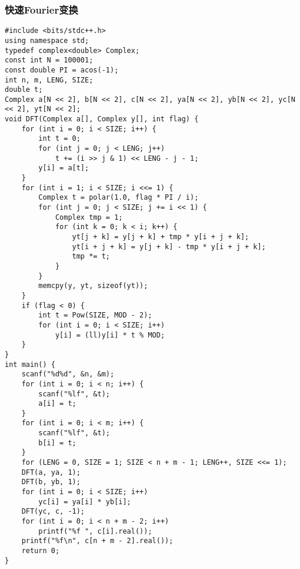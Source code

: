 ﻿\documentclass[a4paper]{article}
\begin{document}
\subsubsection{快速Fourier变换}
\begin{lstlisting}
#include <bits/stdc++.h>
using namespace std;
typedef complex<double> Complex;
const int N = 100001;
const double PI = acos(-1);
int n, m, LENG, SIZE;
double t;
Complex a[N << 2], b[N << 2], c[N << 2], ya[N << 2], yb[N << 2], yc[N << 2], yt[N << 2];
void DFT(Complex a[], Complex y[], int flag) {
    for (int i = 0; i < SIZE; i++) {
        int t = 0;
        for (int j = 0; j < LENG; j++)
            t += (i >> j & 1) << LENG - j - 1;
        y[i] = a[t];
    }
    for (int i = 1; i < SIZE; i <<= 1) {
        Complex t = polar(1.0, flag * PI / i);
        for (int j = 0; j < SIZE; j += i << 1) {
            Complex tmp = 1;
            for (int k = 0; k < i; k++) {
                yt[j + k] = y[j + k] + tmp * y[i + j + k];
                yt[i + j + k] = y[j + k] - tmp * y[i + j + k];
                tmp *= t;
            }
        }
        memcpy(y, yt, sizeof(yt));
    }
    if (flag < 0) {
        int t = Pow(SIZE, MOD - 2);
        for (int i = 0; i < SIZE; i++)
            y[i] = (ll)y[i] * t % MOD;
    }
}
int main() {
    scanf("%d%d", &n, &m);
    for (int i = 0; i < n; i++) {
        scanf("%lf", &t);
        a[i] = t;
    }
    for (int i = 0; i < m; i++) {
        scanf("%lf", &t);
        b[i] = t;
    }
    for (LENG = 0, SIZE = 1; SIZE < n + m - 1; LENG++, SIZE <<= 1);
    DFT(a, ya, 1);
    DFT(b, yb, 1);
    for (int i = 0; i < SIZE; i++)
        yc[i] = ya[i] * yb[i];
    DFT(yc, c, -1);
    for (int i = 0; i < n + m - 2; i++)
        printf("%f ", c[i].real());
    printf("%f\n", c[n + m - 2].real());
    return 0;
}
\end{lstlisting}
\end{document}
